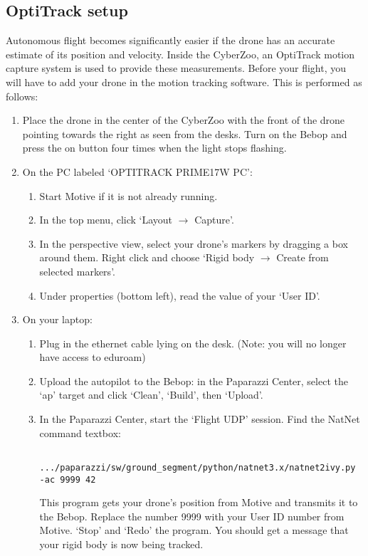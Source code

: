 \subsection*{OptiTrack setup}
Autonomous flight becomes significantly easier if the drone has an accurate estimate of its position and velocity. Inside the CyberZoo, an OptiTrack motion capture system is used to provide these measurements. Before your flight, you will have to add your drone in the motion tracking software. This is performed as follows:
\begin{enumerate}
	\item Place the drone in the center of the CyberZoo with the front of the drone pointing towards the right as seen from the desks. Turn on the Bebop and press the on button four times when the light stops flashing. 
	\item On the PC labeled `OPTITRACK PRIME17W PC':
	\begin{enumerate}
		\item Start Motive if it is not already running.
		\item In the top menu, click `Layout $\rightarrow$ Capture'.
		\item In the perspective view, select your drone's markers by dragging a box around them. Right click and choose `Rigid body $\rightarrow$ Create from selected markers'.
		\item Under properties (bottom left), read the value of your `User ID'.
	\end{enumerate}
	\item On your laptop:
	\begin{enumerate}
		\item Plug in the ethernet cable lying on the desk. (Note: you will no longer have access to eduroam)
		\item Upload the autopilot to the Bebop: in the Paparazzi Center, select the `ap' target and click `Clean', `Build', then `Upload'.
		\item In the Paparazzi Center, start the `Flight UDP' session. Find the NatNet command textbox:
		\begin{verbatim}
			.../paparazzi/sw/ground_segment/python/natnet3.x/natnet2ivy.py -ac 9999 42
		\end{verbatim}
		This program gets your drone's position from Motive and transmits it to the Bebop. Replace the number 9999 with your User ID number from Motive. `Stop' and `Redo' the program. You should get a message that your rigid body is now being tracked.\\

\end{enumerate}
\end{enumerate}
